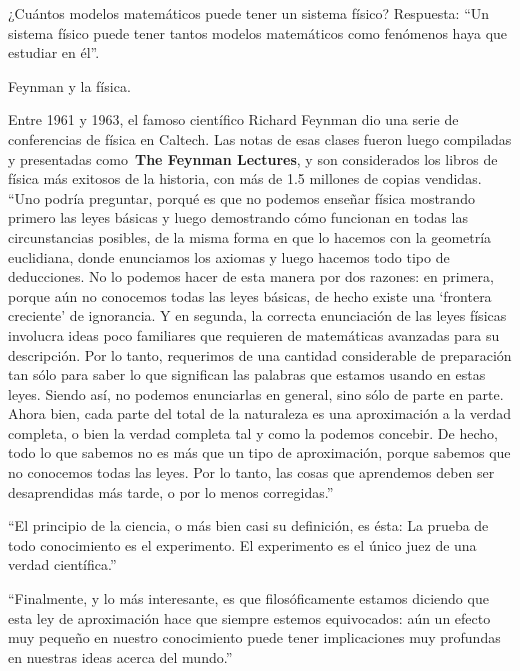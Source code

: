 \vspace{10mm} %
¿Cuántos modelos matemáticos puede tener un sistema físico? Respuesta: ``Un sistema físico puede tener tantos modelos matemáticos como fenómenos haya que estudiar en él''.
	
\newpage %
\begin{myblock}{Feynman y la física.}
\begin{small}	
Entre 1961 y 1963, el famoso científico Richard Feynman dio una serie de conferencias de física en Caltech. Las notas de esas clases fueron luego compiladas y presentadas como \textbf{The Feynman Lectures}, y son considerados los libros de física más exitosos de la historia, con más de 1.5 millones de copias vendidas. 
 
\vspace{2mm} ``Uno podría preguntar, porqué es que no podemos enseñar física mostrando primero las leyes básicas y luego demostrando cómo funcionan en todas las circunstancias posibles, de la misma forma en que lo hacemos con la geometría euclidiana, donde enunciamos los axiomas y luego hacemos todo tipo de deducciones. No lo podemos hacer de esta manera por dos razones: en primera, porque aún no conocemos todas las leyes básicas, de hecho existe una ‘frontera creciente’ de ignorancia. Y en segunda, la correcta enunciación de las leyes físicas involucra ideas poco familiares que requieren de matemáticas avanzadas para su descripción. Por lo tanto, requerimos de una cantidad considerable de preparación tan sólo para saber lo que significan las palabras que estamos usando en estas leyes. Siendo así, no podemos enunciarlas en general, sino sólo de parte en parte.
Ahora bien, cada parte del total de la naturaleza es una aproximación a la verdad completa, o bien la verdad completa tal y como la podemos concebir. De hecho, todo lo que sabemos no es más que un tipo de aproximación, porque sabemos que no conocemos todas las leyes. Por lo tanto, las cosas que aprendemos deben ser desaprendidas más tarde, o por lo menos corregidas.''

\vspace{2mm} ``El principio de la ciencia, o más bien casi su definición, es ésta: La prueba de todo conocimiento es el experimento. El experimento es el único juez de una verdad científica.''

\vspace{2mm} ``Finalmente, y lo más interesante, es que filosóficamente estamos diciendo que esta ley de aproximación hace que siempre estemos equivocados: aún un efecto muy pequeño en nuestro conocimiento puede tener implicaciones muy profundas en nuestras ideas acerca del mundo.''
\end{small}
\hspace{20mm} 
\end{myblock}

